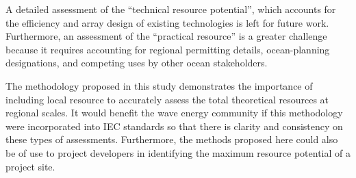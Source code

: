 A detailed assessment of the ``technical resource potential'', which accounts for the efficiency and array design of existing technologies is left for future work. Furthermore, an assessment of the ``practical resource'' is a greater challenge because it requires accounting for regional permitting details, ocean-planning designations, and competing uses by other ocean stakeholders.

The methodology proposed in this study demonstrates the importance of including local resource to accurately assess the total theoretical resources at regional scales. It would benefit the wave energy community if this methodology were incorporated into IEC standards so that there is clarity and consistency on these types of assessments. Furthermore, the methods proposed here could also be of use to project developers in identifying the maximum resource potential of a project site.



